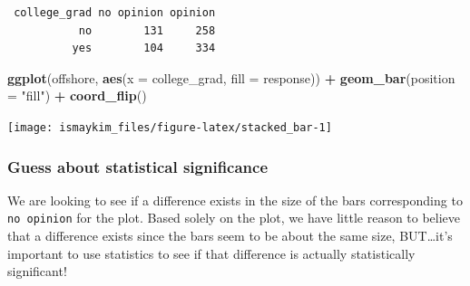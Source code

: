 \documentclass[12pt,]{krantz}
\makeatletter
\newenvironment{Shaded}{\begin{snugshade}}{\end{snugshade}}
\newcommand{\KeywordTok}[1]{\textcolor[rgb]{0.27,0.27,0.27}{\textbf{#1}}}
\newcommand{\DataTypeTok}[1]{\textcolor[rgb]{0.27,0.27,0.27}{#1}}
\newcommand{\StringTok}[1]{\textcolor[rgb]{0.5,0.5,0.5}{#1}}
\newcommand{\OperatorTok}[1]{\textcolor[rgb]{0.43,0.43,0.43}{\textbf{#1}}}
\newcommand{\NormalTok}[1]{#1}
\newenvironment{kframe}{%
\medskip{}
\setlength{\fboxsep}{.8em}
 \def\at@end@of@kframe{}%
 \ifinner\ifhmode%
  \def\at@end@of@kframe{\end{minipage}}%
  \begin{minipage}{\columnwidth}%
 \fi\fi%
 \def\FrameCommand##1{\hskip\@totalleftmargin \hskip-\fboxsep
 \colorbox{shadecolor}{##1}\hskip-\fboxsep
     \hskip-\linewidth \hskip-\@totalleftmargin \hskip\columnwidth}%
 \MakeFramed {\advance\hsize-\width
   \@totalleftmargin\z@ \linewidth\hsize
   \@setminipage}}%
 {\par\unskip\endMakeFramed%
 \at@end@of@kframe}
\renewenvironment{Shaded}{\begin{kframe}}{\end{kframe}}
\theoremstyle{definition}
\theoremstyle{definition}
\theoremstyle{definition}
\theoremstyle{remark}
\makeatother
\begin{document}
\begin{Shaded}
\end{Shaded}

\begin{verbatim}
 college_grad no opinion opinion
           no        131     258
          yes        104     334
\end{verbatim}

\begin{Shaded}
\end{Shaded}

\begin{Shaded}
\begin{Highlighting}[]
\KeywordTok{ggplot}\NormalTok{(offshore, }\KeywordTok{aes}\NormalTok{(}\DataTypeTok{x =}\NormalTok{ college_grad, }\DataTypeTok{fill =}\NormalTok{ response)) }\OperatorTok{+}
\StringTok{  }\KeywordTok{geom_bar}\NormalTok{(}\DataTypeTok{position =} \StringTok{"fill"}\NormalTok{) }\OperatorTok{+}
\StringTok{  }\KeywordTok{coord_flip}\NormalTok{()}
\end{Highlighting}
\end{Shaded}

\begin{center}\texttt{[image: ismaykim\_files/figure-latex/stacked\_bar-1]} \end{center}

\subsubsection*{Guess about statistical
significance}\label{guess-about-statistical-significance-2}

We are looking to see if a difference exists in the size of the bars
corresponding to \texttt{no\ opinion} for the plot. Based solely on the
plot, we have little reason to believe that a difference exists since
the bars seem to be about the same size, BUT\ldots{}it's important to
use statistics to see if that difference is actually statistically
significant!
\end{document}
